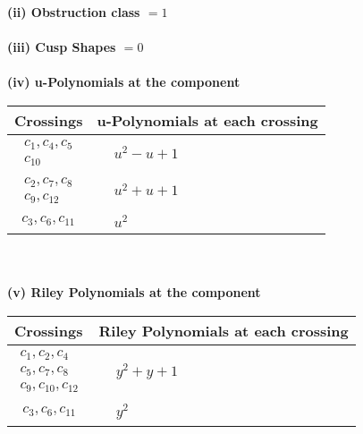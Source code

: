 \documentclass[1p]{elsarticle_modified}
\theoremstyle{definition}
\begin{document}
\flushleft \textbf{(ii) Obstruction class $= 1$}\\~\\
\flushleft \textbf{(iii) Cusp Shapes $= 0$}\\~\\
\newpage\renewcommand{\arraystretch}{1}
\flushleft \textbf{(iv) u-Polynomials at the component}\newline \\
\begin{tabular}{m{50pt}|m{274pt}}
Crossings & \hspace{64pt}u-Polynomials at each crossing \\
\hline $$\begin{aligned}c_{1},c_{4},c_{5}\\c_{10}\end{aligned}$$&$\begin{aligned}
&u^2- u+1
\end{aligned}$\\
\hline $$\begin{aligned}c_{2},c_{7},c_{8}\\c_{9},c_{12}\end{aligned}$$&$\begin{aligned}
&u^2+u+1
\end{aligned}$\\
\hline $$\begin{aligned}c_{3},c_{6},c_{11}\end{aligned}$$&$\begin{aligned}
&u^2
\end{aligned}$\\
\hline
\end{tabular}\\~\\
\newpage\renewcommand{\arraystretch}{1}
\flushleft \textbf{(v) Riley Polynomials at the component}\newline \\
\begin{tabular}{m{50pt}|m{274pt}}
Crossings & \hspace{64pt}Riley Polynomials at each crossing \\
\hline $$\begin{aligned}c_{1},c_{2},c_{4}\\c_{5},c_{7},c_{8}\\c_{9},c_{10},c_{12}\end{aligned}$$&$\begin{aligned}
&y^2+y+1
\end{aligned}$\\
\hline $$\begin{aligned}c_{3},c_{6},c_{11}\end{aligned}$$&$\begin{aligned}
&y^2
\end{aligned}$\\
\hline
\end{tabular}\\~\\
\end{document}
